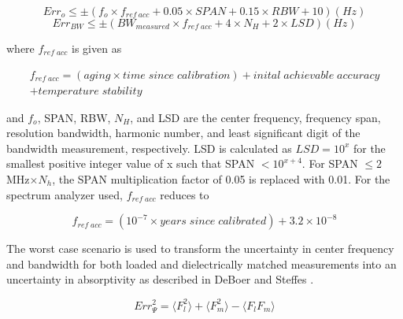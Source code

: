\begin{equation}\label{eq:sigmao}
Err_o \leq \pm (f_o \times f_{ref\:acc} + 0.05 \times SPAN + 0.15 \times RBW +10 ) (Hz)
\end{equation}
\begin{equation}\label{eq:sigmabw}
Err_{BW} \leq \pm (BW_{measured} \times f_{ref\;acc} + 4 \times N_H +2 \times LSD ) (Hz)
\end{equation}

\noindent where $f_{ref\;acc}$ is given as

\begin{equation}\label{eq:frefacclong}
\begin{split}
f_{ref\;acc} = (aging \times {time\;since\;calibration}) + {inital\;achievable\;accuracy} \\
+ {temperature\;stability}
\end{split}
\end{equation}

\noindent and $f_o$, SPAN, RBW, $N_H$, and LSD are the center frequency, frequency span, resolution bandwidth, harmonic number, and least significant digit of the bandwidth measurement, respectively. LSD is calculated as $LSD = 10^x$ for the smallest positive integer value of x such that SPAN $< 10^{x+4}$. For SPAN $\leq 2$ MHz$\times N_h$, the SPAN multiplication factor of 0.05 is replaced with 0.01. For the spectrum analyzer used, $f_{ref\;acc}$ reduces to

\begin{equation}\label{eq:frefacc}
f_{ref\;acc} = (10^{-7} \times {years\;since\;calibrated}) + 3.2\times 10^{-8}
\end{equation}

The worst case scenario is used to transform the uncertainty in center frequency and bandwidth for both loaded and dielectrically matched measurements into an uncertainty in absorptivity as described in DeBoer and Steffes \cite{DeBoer-Steffes}.

\begin{equation}
Err^2_\Psi = \langle {F_l^2}\rangle + \langle {F_m^2}\rangle -\langle {F_l F_m}\rangle
\end{equation}


